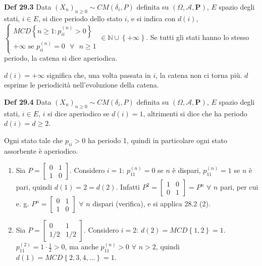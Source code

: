 \documentclass{article}
\begin{document}
\textbf{Def 29.3} Data $\left( X_{n}\right) _{n\geq 0}\sim CM\left( \delta
_{i},P\right) $ definita su $\left( \Omega ,\mathcal{A},\mathbf{P}\right) $, 
$E$ spazio degli stati, $i\in E$, si dice periodo dello stato $i$, e si
indica con $d\left( i\right) $, $\left\{ 
\begin{array}{c}
MCD\left\{ n\geq 1:p_{ii}^{\left( n\right) }>0\right\} \\ 
+\infty \text{ se }p_{ii}^{\left( n\right) }=0\text{ }\forall \text{ }n\geq 1%
\end{array}%
\right. \in 
\mathbb{N}
\cup \left\{ +\infty \right\} $. Se tutti gli stati hanno lo stesso periodo,
la catena si dice aperiodica.

$d\left( i\right) =+\infty $ significa che, una volta passata in $i$, la
catena non ci torna pi\`{u}. $d$ esprime le periodicit\`{a} nell'evoluzione
della catena.

\textbf{Def 29.4} Data $\left( X_{n}\right) _{n\geq 0}\sim CM\left( \delta
_{i},P\right) $ definita su $\left( \Omega ,\mathcal{A},\mathbf{P}\right) $, 
$E$ spazio degli stati, $i\in E$, $i$ si dice aperiodico se $d\left(
i\right) =1$, altrimenti si dice che ha periodo $d\left( i\right) =d\geq 2$.

Ogni stato tale che $p_{ii}>0$ ha periodo 1, quindi in particolare ogni
stato assorbente \`{e} aperiodico.

\begin{enumerate}
\item Sia $P=\left[ 
\begin{array}{cc}
0 & 1 \\ 
1 & 0%
\end{array}%
\right] $. Considero $i=1$: $p_{11}^{\left( n\right) }=0$ se $n$ \`{e}
dispari, $p_{11}^{\left( n\right) }=1$ se $n$ \`{e} pari, quindi $d\left(
1\right) =2=d\left( 2\right) $. Infatti $P^{2}=\left[ 
\begin{array}{cc}
1 & 0 \\ 
0 & 1%
\end{array}%
\right] =P^{n}$ $\forall $ $n$ pari, per cui e. g. $P^{n}=\left[ 
\begin{array}{cc}
0 & 1 \\ 
1 & 0%
\end{array}%
\right] $ $\forall $ $n$ dispari (verifica), e si applica 28.2 (2).

\item Sia $P=\left[ 
\begin{array}{cc}
0 & 1 \\ 
1/2 & 1/2%
\end{array}%
\right] $. Considero $i=2$: $d\left( 2\right) =MCD\left\{ 1,2\right\} =1$. $%
p_{11}^{\left( 2\right) }=1\cdot \frac{1}{2}>0$, ma anche $p_{11}^{\left(
n\right) }>0$ $\forall $ $n>2$, quindi $d\left( 1\right) =MCD\left\{
2,3,4,...\right\} =1$.
\end{enumerate}
\end{document}
